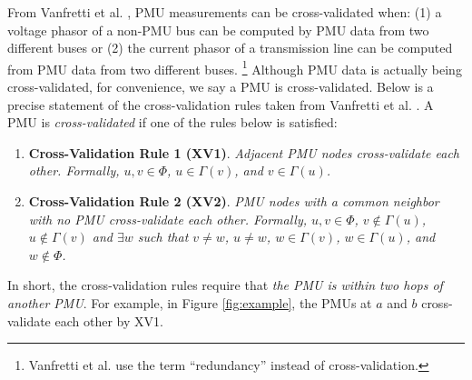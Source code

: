 From Vanfretti et al. \cite{Vanfretti10}, PMU measurements can be cross-validated when: (1) a 
voltage phasor of a non-PMU bus can be computed by PMU data from two different buses or (2) the current phasor of a transmission line can be computed from PMU data from two different buses. 
{\footnote {\small  Vanfretti et al. \cite{Vanfretti10} use the term ``redundancy'' instead of cross-validation. }}  
Although PMU data is actually being cross-validated,
for convenience, we say a PMU is cross-validated. Below is a precise statement of the cross-validation rules taken from  Vanfretti et al. \cite{Vanfretti10}. 
A PMU is \emph{cross-validated} if one of the rules below is satisfied: 
\begin{enumerate}
	
	\item {\bf Cross-Validation Rule 1 (XV1)}.  {\it Adjacent PMU nodes cross-validate each other. %
	Formally, $u, v \in \Phi$, $u \in \Gamma(v)$, and $v \in \Gamma(u)$.}

	\item {\bf Cross-Validation Rule 2 (XV2)}. {\it PMU nodes with a common neighbor with no PMU cross-validate each other. %
	Formally, $u, v \in \Phi$, $v \notin \Gamma(u)$, 
	$u \notin \Gamma(v)$ and $\exists w$ such that $v \neq w$, $u \neq w$, $w \in \Gamma(v)$, $w \in \Gamma(u)$, and $w \notin \Phi$.}
\end{enumerate}
In short, the cross-validation rules require that {\em the PMU is within two hops of another PMU}.
For example, in Figure \ref{fig:example}, the PMUs at $a$ and $b$ cross-validate each other by XV1. 




